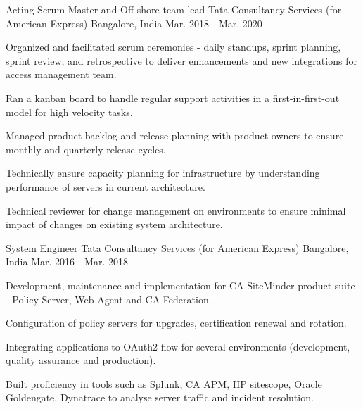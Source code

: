 

\begin{cventries}

  \cventry
    {Acting Scrum Master and Off-shore team lead} %
    {Tata Consultancy Services (for American Express)} %
    {Bangalore, India} %
    {Mar. 2018 - Mar. 2020} %
    {
      \begin{cvitems} %
        \item {Organized and facilitated scrum ceremonies - daily standups, sprint planning, sprint review, and retrospective to deliver enhancements and new integrations for access management team.}
        \item {Ran a kanban board to handle regular support activities in a first-in-first-out model for high velocity tasks.}
        \item {Managed product backlog and release planning with product owners to ensure monthly and quarterly release cycles.}
        \item {Technically ensure capacity planning for infrastructure by understanding performance of servers in current architecture.}
        \item {Technical reviewer for change management on environments to ensure minimal impact of changes on existing system architecture.}
      \end{cvitems}
    }

  \cventry
    {System Engineer} %
    {Tata Consultancy Services (for American Express)} %
    {Bangalore, India} %
    {Mar. 2016 - Mar. 2018} %
    {
      \begin{cvitems} %
        \item {Development, maintenance and implementation for CA SiteMinder product suite - Policy Server, Web Agent and CA Federation.}
        \item {Configuration of policy servers for upgrades, certification renewal and rotation.}
        \item {Integrating applications to OAuth2 flow for several environments (development, quality assurance and production).}
        \item {Built proficiency in tools such as Splunk, CA APM, HP sitescope, Oracle Goldengate, Dynatrace to analyse server traffic and incident resolution.}
      \end{cvitems}
    }

\end{cventries}
